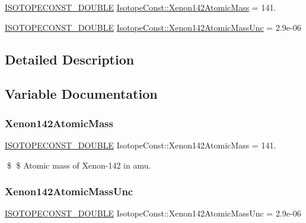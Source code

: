 \begin{DoxyCompactItemize}
\item 
\mbox{\hyperlink{group___isotope_const-_macros_ga8f45a7272ce02c0b4c65c44636ed719a}{I\+S\+O\+T\+O\+P\+E\+C\+O\+N\+S\+T\+\_\+\+D\+O\+U\+B\+LE}} \mbox{\hyperlink{group___isotope_const-_xenon-_xe142_gabef194b270a54179e9f9238d54c45612}{Isotope\+Const\+::\+Xenon142\+Atomic\+Mass}} = 141.
\item 
\mbox{\hyperlink{group___isotope_const-_macros_ga8f45a7272ce02c0b4c65c44636ed719a}{I\+S\+O\+T\+O\+P\+E\+C\+O\+N\+S\+T\+\_\+\+D\+O\+U\+B\+LE}} \mbox{\hyperlink{group___isotope_const-_xenon-_xe142_ga42f8cadc8250659387a1f135065993bb}{Isotope\+Const\+::\+Xenon142\+Atomic\+Mass\+Unc}} = 2.\+9e-\/06
\end{DoxyCompactItemize}


\subsection{Detailed Description}


\subsection{Variable Documentation}
\mbox{\label{group___isotope_const-_xenon-_xe142_gabef194b270a54179e9f9238d54c45612}} 
\subsubsection{\texorpdfstring{Xenon142\+Atomic\+Mass}{Xenon142AtomicMass}}
{\footnotesize\ttfamily \mbox{\hyperlink{group___isotope_const-_macros_ga8f45a7272ce02c0b4c65c44636ed719a}{I\+S\+O\+T\+O\+P\+E\+C\+O\+N\+S\+T\+\_\+\+D\+O\+U\+B\+LE}} Isotope\+Const\+::\+Xenon142\+Atomic\+Mass = 141.}

\$ \$ Atomic mass of Xenon-\/142 in amu. \mbox{\label{group___isotope_const-_xenon-_xe142_ga42f8cadc8250659387a1f135065993bb}} 
\subsubsection{\texorpdfstring{Xenon142\+Atomic\+Mass\+Unc}{Xenon142AtomicMassUnc}}
{\footnotesize\ttfamily \mbox{\hyperlink{group___isotope_const-_macros_ga8f45a7272ce02c0b4c65c44636ed719a}{I\+S\+O\+T\+O\+P\+E\+C\+O\+N\+S\+T\+\_\+\+D\+O\+U\+B\+LE}} Isotope\+Const\+::\+Xenon142\+Atomic\+Mass\+Unc = 2.\+9e-\/06}

